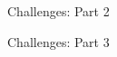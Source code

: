 \documentclass[notes, xcolor = dvipsnames]{beamer}
\begin{document}
    \begin{frame}{Challenges: Part 2}

            

    \end{frame}

    \begin{frame}{Challenges: Part 3}




    \end{frame}
\end{document}
